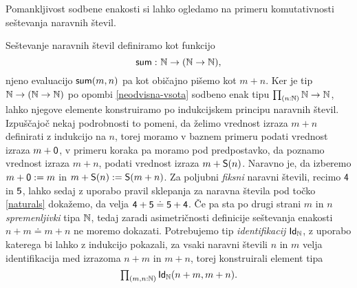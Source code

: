 Pomankljivost sodbene enakosti si lahko ogledamo na primeru komutativnosti seštevanja naravnih števil.

\begin{primer}
  Seštevanje naravnih števil definiramo kot funkcijo
  \[\textnormal{\textsf{sum}} \,\colon \mathbb N \to (\mathbb N \to \mathbb N),\] njeno evaluacijo \(\textnormal{\textsf{sum}}(m, n)\)
  pa kot običajno pišemo kot \(m + n\).
  Ker je tip \(\mathbb N \to (\mathbb N \to \mathbb N)\) po opombi \ref{neodvisna-vsota} sodbeno enak tipu
  \(\textstyle \prod_{\left( {n : \mathbb N} \right)} \mathbb N \to \mathbb N\), lahko njegove elemente konstruiramo po indukcijskem
  principu naravnih števil.
  Izpuščajoč nekaj podrobnosti to pomeni, da želimo vrednost izraza \(m + n\) definirati z
  indukcijo na \(n\), torej moramo v baznem primeru podati vrednost izraza \(m + \textnormal{\textsf{0}}\),
  v primeru koraka pa moramo pod predpostavko, da poznamo vrednost izraza \(m + n\),
  podati vrednost izraza \(m + \textnormal{\textsf{S}}(n)\). Naravno je,
  da izberemo \(m + \textnormal{\textsf{0}} := m\) in \(m + \textnormal{\textsf{S}}(n) := \textnormal{\textsf{S}}(m + n)\).
  Za poljubni \emph{fiksni} naravni števili, recimo
  \(\textnormal{\textsf{4}}\) in \(\textnormal{\textsf{5}}\), lahko sedaj z uporabo pravil sklepanja za naravna
  števila pod točko \ref{naturals} dokažemo, da velja
  \(\textnormal{\textsf{4}} + \textnormal{\textsf{5}} \doteq \textnormal{\textsf{5}} + \textnormal{\textsf{4}}\). Če pa sta po drugi strani
  \(m\) in \(n\)
  \emph{spremenljivki} tipa \(\mathbb N\), tedaj zaradi asimetričnosti definicije seštevanja
  enakosti \(n + m \doteq m + n\) ne moremo
  dokazati. Potrebujemo tip \emph{identifikacij} \(\textnormal{\textsf{Id}}_{\mathbb N}\), z uporabo katerega bi
  lahko z indukcijo pokazali, za vsaki naravni števili \(n\) in \(m\) velja identifikacija med izrazoma \(n + m\) in \(m + n\), torej konstruirali element tipa
  \[\textstyle \prod_{\left( {m, n : \mathbb N} \right)} \textnormal{\textsf{Id}}_{\mathbb N}(n + m, m + n).\]
\end{primer}

